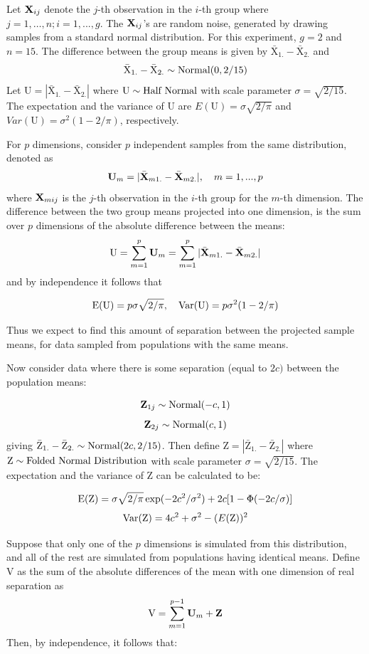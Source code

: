 Let ${\mbox{\boldmath {\bf X}}}_{ij}$ denote the $j$-th observation in the $i$-th group where $j = 1, \dots, n; i=1, ..., g$. The ${\mbox{\boldmath {\bf X}}}_{ij}$'s are random noise, generated by drawing samples from a standard normal distribution. For this experiment, $g = 2$  and $n = 15$. The difference between the group means is given by $\bar{\mbox{X}}_{1.} - \bar{\mbox{X}}_{2.}$%
and $$\bar{\mbox{X}}_{1.} - \bar{\mbox{X}}_{2.} \sim \hbox{Normal}(0, 2/15)$$ Let 
$\mbox{U} = |\bar{\mbox{X}} _{1.} - \bar{\mbox{X}}_{2.}|$ 
where $\mbox{U} \sim \hbox{Half Normal}$ with scale parameter $ \sigma = \sqrt{2/15}$.
The expectation and the variance of $\mbox{U}$ are 
$E(\mbox{U} ) = \sigma \sqrt{2/\pi}$ and 
$Var(\mbox{U}) = \sigma^2 (1 - 2/\pi)$, respectively.

For $p$ dimensions, consider $p$ independent samples from the same distribution,  denoted as $${\mbox{\boldmath {\bf U}}}_m = |\bar{{\mbox{\boldmath {\bf X}}}}_{m1.} - \bar{{\mbox{\boldmath {\bf X}}}}_{m2.}|, ~~~ m=1, ..., p$$ where ${\mbox{\boldmath {\bf X}}} _{mij}$ is the $j$-th observation in the $i$-th group for the $m$-th dimension. The difference between the two group means projected into one dimension, is the sum over $p$ dimensions of the absolute difference between the means: $$\mbox{U}  = \sum_{m=1}^p {\mbox{\boldmath {\bf U}}}_m = \sum_{m=1}^p |\bar{{\mbox{\boldmath {\bf X}}}}_{m1.} - \bar{{\mbox{\boldmath {\bf X}}}}_{m2.}| $$ and by independence it follows that

$$\hbox{E}(\mbox{U}) = p \sigma \sqrt{2/\pi}, ~~~ 
\hbox{Var}(\mbox{U}) = p \sigma^2 (1 - 2/\pi)$$

\noindent Thus we expect to find this amount of separation between the projected sample means, for data sampled from populations with the same means.

Now consider data where there is some separation (equal to $2c)$ between the population means:

$${\mbox{\boldmath {\bf Z}}}_{1j} \sim \hbox{Normal}(-c, 1) $$
$${\mbox{\boldmath {\bf Z}}}_{2j} \sim \hbox{Normal}(c, 1) $$ 
giving $\bar{\mbox{Z}}_{1.} - \bar{\mbox{Z}}_{2.} \sim \hbox{Normal}(2c, 2/15)$. Then define $\mbox{Z}  = |\bar{\mbox{Z}}_{1.} - \bar{\mbox{Z}}_{2.}|$ where ${\mbox{Z}} \sim \hbox{Folded Normal Distribution}$ with scale parameter $ \sigma = \sqrt{2/15}$.  The expectation and the variance of $\mbox{Z}$ can be calculated to be:

$$\hbox{E}(\mbox{Z}) = \sigma \sqrt{2/\pi} \exp(- 2c^2/\sigma^2) + 2c[1 - \Phi(-2c/\sigma)]$$
$$\hbox{Var}(\mbox{Z}) = 4c^2 + \sigma^2 - (E(\mbox{Z}))^2$$

Suppose that only one of the $p$ dimensions is simulated from this distribution, and all of the rest are simulated from populations having identical means. Define $\mbox{V}$ as the sum of the absolute differences of the mean with one dimension of real separation as $$\mbox{V} = \sum_{m=1}^{p-1} \mbox{\boldmath {\bf U}}_m + {\mbox{\boldmath {\bf Z}}}$$ Then, by independence, it follows that:

